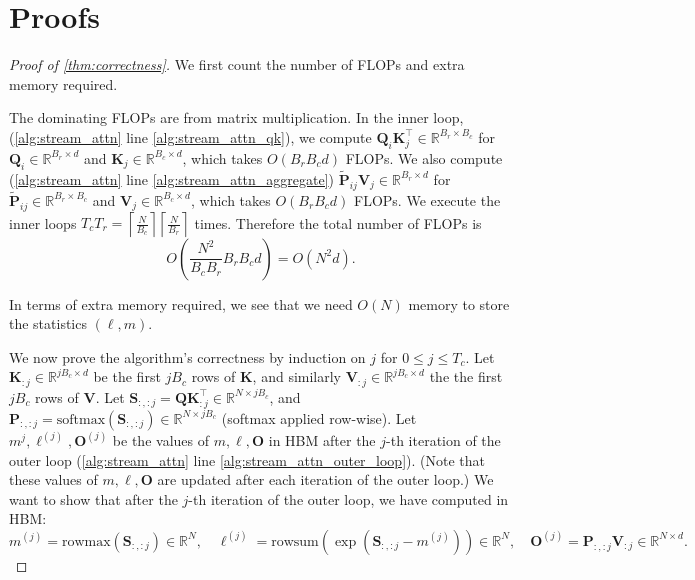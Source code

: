 \documentclass{article}
\newcommand{\vQ}{\mathbf{Q}}
\newcommand{\vK}{\mathbf{K}}
\newcommand{\vV}{\mathbf{V}}
\newcommand{\vS}{\mathbf{S}}
\newcommand{\vP}{\mathbf{P}}
\newcommand{\vO}{\mathbf{O}}
\begin{document}
\section{Proofs}
\label{sec:proofs}

\begin{proof}[Proof of \cref{thm:correctness}]
  We first count the number of FLOPs and extra memory required.

  The dominating FLOPs are from matrix multiplication.
  In the inner loop, (\cref{alg:stream_attn} line \ref{alg:stream_attn_qk}), we
  compute $\vQ_i \vK_j^\top \in \mathbb{R}^{B_r \times B_c}$ for $\vQ_i \in \mathbb{R}^{B_r \times d}$ and
  $\vK_j \in \mathbb{R}^{B_c \times d}$, which takes $O(B_r B_c d)$ FLOPs.
  We also compute (\cref{alg:stream_attn} line \ref{alg:stream_attn_aggregate}) $\tilde{\vP}_{ij} \vV_j \in \mathbb{R}^{B_r \times d}$ for
  $\tilde{\vP}_{ij} \in \mathbb{R}^{B_r \times B_c}$ and $\vV_j \in \mathbb{R}^{B_c \times d}$, which takes $O(B_r B_c d)$ FLOPs.
  We execute the inner loops
  $T_c T_r = \left\lceil  \frac{N}{B_c} \right\rceil \left\lceil \frac{N}{B_r} \right\rceil$ times.
  Therefore the total number of FLOPs is
  \begin{equation*}
    O \left( \frac{N^2}{B_c B_r} B_r B_c d \right) = O(N^2d).
  \end{equation*}

  In terms of extra memory required, we see that we need $O(N)$ memory to store
  the statistics $(\ell, m)$.

  We now prove the algorithm's correctness by induction on $j$ for
  $0 \leq j \leq T_c$.
  Let $\vK_{:j} \in \mathbb{R}^{jB_c \times d}$ be the first $jB_c$ rows of $\vK$, and similarly
  $\vV_{:j} \in \mathbb{R}^{jB_c \times d}$ the the first $jB_c$ rows of $\vV$.
  Let $\vS_{:, :j} = \vQ \vK_{:j}^\top \in \mathbb{R}^{N \times jB_c}$, and
  $\vP_{:, :j} = \mathrm{softmax}(\vS_{:, :j}) \in \mathbb{R}^{N \times jB_c}$ (softmax applied row-wise).
  Let $m^{j}, \ell^{(j)}, \vO^{(j)}$ be the values of $m, \ell, \vO$ in HBM after the
  $j$-th iteration of the outer loop (\cref{alg:stream_attn} line \ref{alg:stream_attn_outer_loop}).
  (Note that these values of $m, \ell, \vO$ are updated after each iteration of the outer loop.)
  We want to show that after the $j$-th iteration of the outer loop, we have
  computed in HBM:
  \begin{equation*}
    m^{(j)} = \mathrm{rowmax}(\vS_{:, :j}) \in \mathbb{R}^N, \quad
    \ell^{(j)} = \mathrm{rowsum}(\exp(\vS_{:, :j} - m^{(j)})) \in \mathbb{R}^N, \quad
    \vO^{(j)} = \vP_{:, :j} \vV_{:j} \in \mathbb{R}^{N \times d}.
  \end{equation*}


\end{proof}
\end{document}
